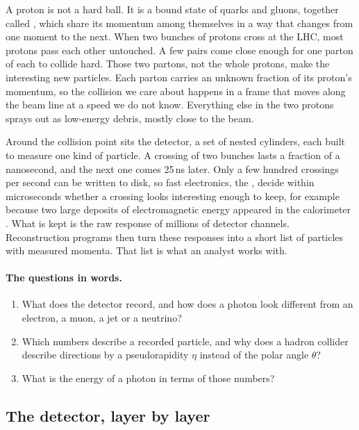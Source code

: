 A proton is not a hard ball. It is a bound state of quarks and gluons, together called , which share its momentum among themselves in a way that changes from one moment to the next. When two bunches of protons cross at the LHC, most protons pass each other untouched. A few pairs come close enough for one parton of each to collide hard. Those two partons, not the whole protons, make the interesting new particles. Each parton carries an unknown fraction of its proton's momentum, so the collision we care about happens in a frame that moves along the beam line at a speed we do not know. Everything else in the two protons sprays out as low-energy debris, mostly close to the beam.

Around the collision point sits the detector, a set of nested cylinders, each built to measure one kind of particle. A crossing of two bunches lasts a fraction of a nanosecond, and the next one comes 25\,ns later. Only a few hundred crossings per second can be written to disk, so fast electronics, the , decide within microseconds whether a crossing looks interesting enough to keep, for example because two large deposits of electromagnetic energy appeared in the calorimeter \cite{ATLASDetector2008}. What is kept is the raw response of millions of detector channels. Reconstruction programs then turn these responses into a short list of particles with measured momenta. That list is what an analyst works with.

\paragraph{The questions in words.}
\begin{enumerate}[label=\arabic*.]
  \item What does the detector record, and how does a photon look different from an electron, a muon, a jet or a neutrino?
  \item Which numbers describe a recorded particle, and why does a hadron collider describe directions by a pseudorapidity $\eta$ instead of the polar angle $\theta$?
  \item What is the energy of a photon in terms of those numbers?
\end{enumerate}

\subsection{The detector, layer by layer}
\label{T4a:sec:detector}

